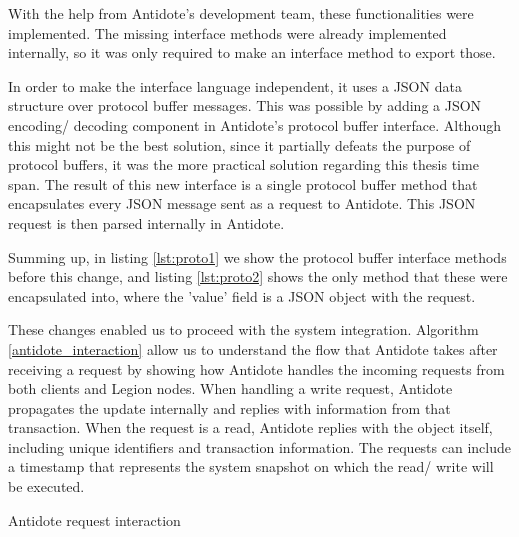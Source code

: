 \par
	With the help from Antidote's development team, these functionalities were implemented. The missing interface methods were already implemented internally, so it was only required to make an interface method to export those.\par
	In order to make the interface language independent, it uses a JSON data structure over protocol buffer messages. This was possible by adding a JSON encoding/ decoding component in Antidote's protocol buffer interface. Although this might not be the best solution, since it partially defeats the purpose of protocol buffers, it was the more practical solution regarding this thesis time span. The result of this new interface is a single protocol buffer method that encapsulates every JSON message sent as a request to Antidote. This JSON request is then parsed internally in Antidote.\par
	Summing up, in listing \ref{lst:proto1} we show the protocol buffer interface methods before this change, and listing \ref{lst:proto2} shows the only method that these were encapsulated into, where the 'value' field is a JSON object with the request.\par
	These changes enabled us to proceed with the system integration. Algorithm \ref{antidote_interaction} allow us to understand the flow that Antidote takes after receiving a request by showing how Antidote handles the incoming requests from both clients and Legion nodes. When handling a write request, Antidote propagates the update internally and replies with information from that transaction. When the request is a read, Antidote replies with the object itself, including unique identifiers and transaction information. The requests can include a timestamp that represents the system snapshot on which the read/ write will be executed.
	
\begin{algorithm}[H]
\caption{Antidote request interaction}\label{antidote_interaction}
\begin{algorithmic}[1]
    \End
    \End
  \End
\End
\end{algorithmic}
\end{algorithm}

